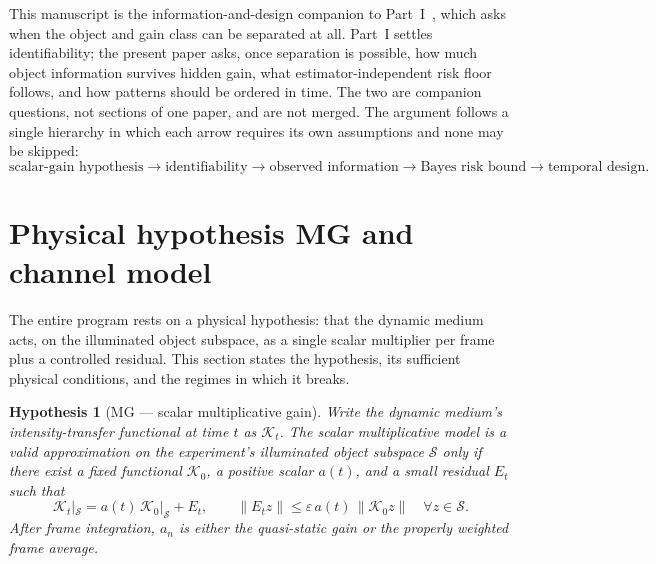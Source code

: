 \documentclass[11pt]{article}
\newtheorem{hypothesis}{Hypothesis}
\theoremstyle{remark}
\begin{document}
This manuscript is the information-and-design companion to
Part~I~\cite{companion}, which asks when the object and gain class can be
separated at all. Part~I settles identifiability; the present paper asks, once
separation is possible, how much object information survives hidden gain, what
estimator-independent risk floor follows, and how patterns should be ordered in
time. The two are companion questions, not sections of one paper, and are not
merged. The argument follows a single hierarchy in which each arrow requires
its own assumptions and none may be skipped:
\begin{equation*}
\text{scalar-gain hypothesis}
\rightarrow \text{identifiability}
\rightarrow \text{observed information}
\rightarrow \text{Bayes risk bound}
\rightarrow \text{temporal design}.
\end{equation*}

\section{Physical hypothesis MG and channel model}
\label{sec:mg}
The entire program rests on a physical hypothesis: that the dynamic medium acts,
on the illuminated object subspace, as a single scalar multiplier per frame plus
a controlled residual. This section states the hypothesis, its sufficient
physical conditions, and the regimes in which it breaks.

\begin{hypothesis}[MG --- scalar multiplicative gain]
\label{hyp:mg}
Write the dynamic medium's intensity-transfer functional at time $t$ as
$\mathcal K_t$. The scalar multiplicative model is a valid approximation on the
experiment's illuminated object subspace $\mathcal S$ only if there exist a
fixed functional $\mathcal K_0$, a positive scalar $a(t)$, and a small residual
$E_t$ such that
\begin{equation}
\mathcal K_t|_{\mathcal S}
= a(t)\,\mathcal K_0|_{\mathcal S} + E_t,
\qquad
\|E_t z\| \le \varepsilon\, a(t)\,\|\mathcal K_0 z\|
\quad \forall z \in \mathcal S.
\tag{MG}\label{eq:mg}
\end{equation}
After frame integration, $a_n$ is either the quasi-static gain or the properly
weighted frame average.
\end{hypothesis}
\end{document}
